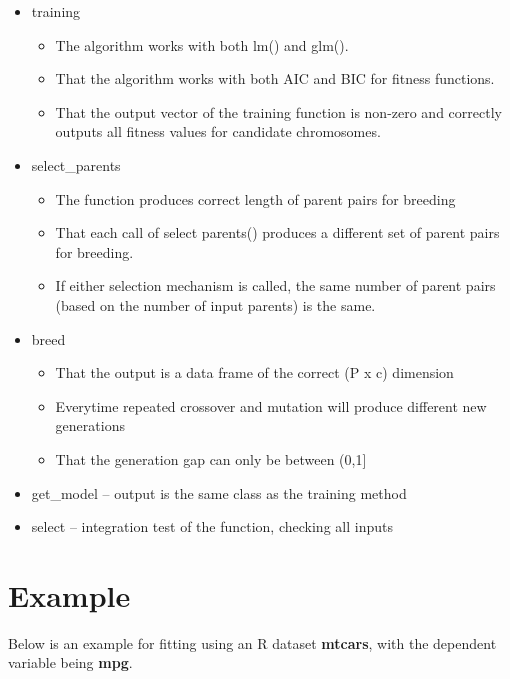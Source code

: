 \documentclass{article}\usepackage[]{graphicx}\usepackage[]{color}
\begin{document}
\begin{itemize}
  \item training
  \begin{itemize}
    \item The algorithm works with both lm() and glm().
    \item That the algorithm works with both AIC and BIC for fitness functions.
    \item That the output vector of the training function is non-zero and correctly outputs all
          fitness values for candidate chromosomes.
  \end{itemize}
  \item select_parents
  \begin{itemize}
    \item The function produces correct length of parent pairs for breeding
    \item That each call of select parents() produces a different set of parent pairs for breeding.
    \item If either selection mechanism is called, the same number of parent pairs (based on the
          number of input parents) is the same.
  \end{itemize}
  \item breed
  \begin{itemize}
    \item That the output is a data frame of the correct (P x c) dimension
    \item Everytime repeated crossover and mutation will produce different new generations
    \item That the generation gap can only be between (0,1]
  \end{itemize}
  \item get\_model -- output is the same class as the training method
  \item select -- integration test of the function, checking all inputs
\end{itemize}

\section{Example}
Below is an example for fitting using an R dataset \textbf{mtcars}, with the dependent variable being \textbf{mpg}.
\end{document}
